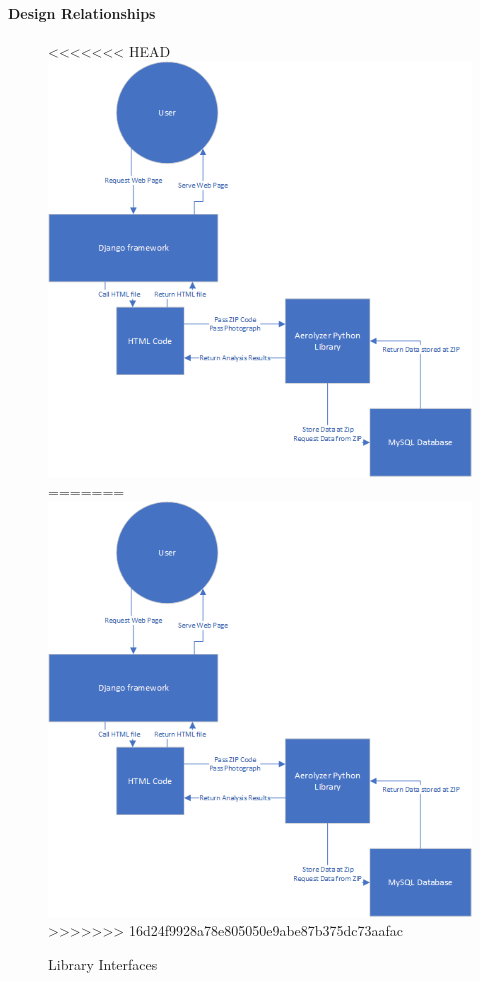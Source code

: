 \documentclass[onecolumn, draftclsnofoot,10pt, compsoc]{IEEEtran}
\begin{document}
\begin{singlespace}
          \paragraph{Design Relationships}
            \begin{figure}[h]
            	\centering
<<<<<<< HEAD
                \includegraphics[width=4.5in,natwidth=600,natheight=588]{images/DesignInterface.png}
=======
                \includegraphics[width=4.5in]{DesignInterface.png}
>>>>>>> 16d24f9928a78e805050e9abe87b375dc73aafac
                \caption{Library Interfaces}
                \label{fig:1}
            \end{figure}

\end{singlespace}
\end{document}
